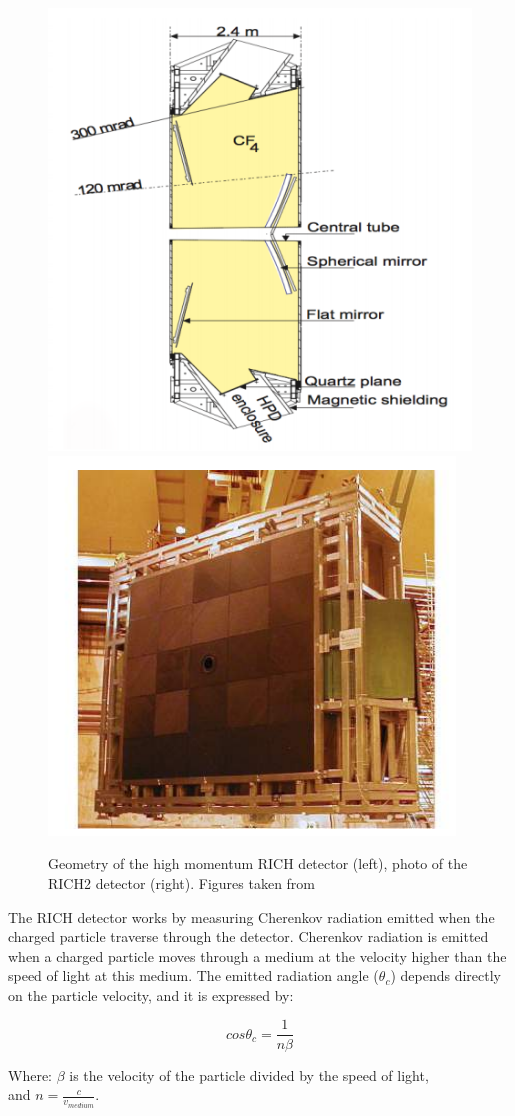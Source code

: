 \begin{figure}[h]
 \begin{center}
  \includegraphics[width=0.49\linewidth]{figures/RICH2.PNG}
   \includegraphics[width=0.49\linewidth]{figures/RICH2_photo.PNG}
    \caption{Geometry of the high momentum RICH detector (left), photo of the RICH2 detector (right). Figures taken from \cite{lhcb}}%
    \label{fig:RICH2}%
 \end{center}
\end{figure}


The RICH detector works by measuring Cherenkov radiation emitted when the charged particle traverse through the detector. Cherenkov radiation is emitted when a charged particle moves through a medium at the velocity higher than the speed of light at this medium. The emitted radiation angle ($\theta_c$) depends directly on the particle velocity, and it is expressed by:

\begin{equation}
cos \theta_c = \frac{1}{n\beta}
\end{equation}

Where: $\beta$ is the velocity of the particle divided by the speed of light,\\ and $n = \frac{c}{v_{medium}}$. 

